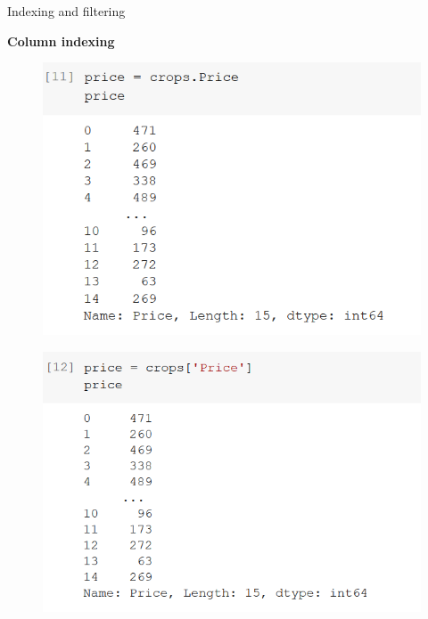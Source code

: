 \documentclass[aspectratio=169]{beamer}
\begin{document}
\begin{frame}{Indexing and filtering}

	\textbf{Column indexing}

	\begin{multicols}{2}

		\begin{figure}
			\centering
			\includegraphics[width=0.95\linewidth]{img/col_subset1.png}
		\end{figure}
		\begin{figure}
			\centering
			\includegraphics[width=0.99\linewidth]{img/col_subset2.png}
		\end{figure}

	\end{multicols}

\end{frame}
\end{document}
